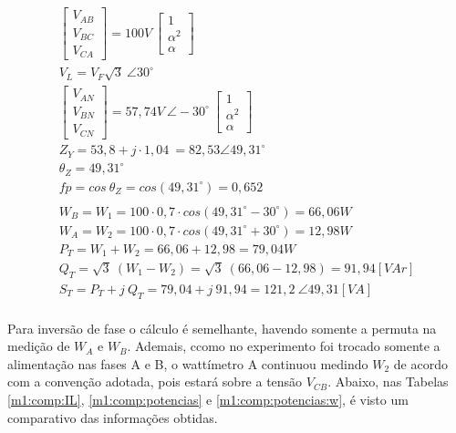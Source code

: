 \documentclass[a4paper,12pt,oneside,openany,table,xcdraw]{article}
\begin{document}
\begin{gather*}
\begin{bmatrix}
V_{AB}\\
V_{BC}\\
V_{CA}
\end{bmatrix} =100V\ \begin{bmatrix}
1\\
\alpha ^{2}\\
\alpha 
\end{bmatrix}\\
V_{L} =V_{F}\sqrt{3} \ \angle 30^{\circ }\\
\begin{bmatrix}
V_{AN}\\
V_{BN}\\
V_{CN}
\end{bmatrix} =57,74V\ \angle -30^{\circ } \ \begin{bmatrix}
1\\
\alpha ^{2}\\
\alpha 
\end{bmatrix}\\
Z_{Y} =53,8+j\cdotp 1,04\ =82,53\angle 49,31^{\circ }\\
\theta _{Z} =49,31^{\circ }\\
fp=cos\ \theta _{Z} =cos\left( 49,31^{\circ }\right) =0,652\\
\\
W_{B} =W_{1} =100\cdotp 0,7\cdotp cos\left( 49,31^{\circ } -30^{\circ }\right) =66,06W\\
W_{A} =W_{2} =100\cdotp 0,7\cdotp cos\left( 49,31^{\circ } +30^{\circ }\right) =12,98W\\
P_{T} =W_{1} +W_{2} =66,06+12,98=79,04W\\
Q_{T} =\sqrt{3} \ ( W_{1} -W_{2}) =\sqrt{3} \ ( 66,06-12,98) =91,94 [VAr]\\
S_{T} =P_{T} +j\ Q_{T} =79,04+j\ 91,94=121,2\ \angle 49,31 [VA]\\
\end{gather*}

Para inversão de fase o cálculo é semelhante, havendo somente a permuta na medição de $W_A$ e $W_B$. Ademais, ccomo no experimento foi trocado somente a alimentação nas fases A e B, o wattímetro A continuou medindo $W_2$ de acordo com a convenção adotada, pois estará sobre a tensão $V_{CB}$. 
Abaixo, nas Tabelas \ref{m1:comp:IL}, \ref{m1:comp:potencias} e \ref{m1:comp:potencias:w}, é visto um comparativo das informações obtidas.
\end{document}
